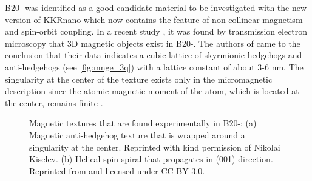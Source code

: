 \documentclass [a4paper, 12pt]{article}
\begin{document}
B20- was identified as a good candidate material to be investigated with the new
version of KKRnano which now contains the feature of non-collinear magnetism and spin-orbit coupling.
In a recent study \cite{tanigaki_real-space_2015}, it was 
found by transmission electron microscopy that 3D magnetic
objects exist in B20-. The authors of \cite{tanigaki_real-space_2015}
came to the conclusion that their data indicates a
cubic lattice of skyrmionic hedgehogs
and anti-hedgehogs (see \cref{fig:mnge_3q}) 
with a lattice constant of about 3-6 nm.
The singularity at the center of the texture exists only in the micromagnetic description since the
atomic magnetic moment of the atom, which is located at the center,
remains finite \cite{feldtkeller_continuous_2017}.
\begin{figure}[htb]
	\hfill
	\hfill
 \caption{Magnetic textures that are found experimentally in B20-: (a) 
	Magnetic anti-hedgehog texture that is wrapped around a singularity at the center.
	Reprinted with kind permission of Nikolai Kiselev. (b) Helical
	spin spiral that propagates in (001) direction. Reprinted from \cite{rybakov_new_2016} and
	licensed under CC BY 3.0.}
\end{figure}
\end{document}
